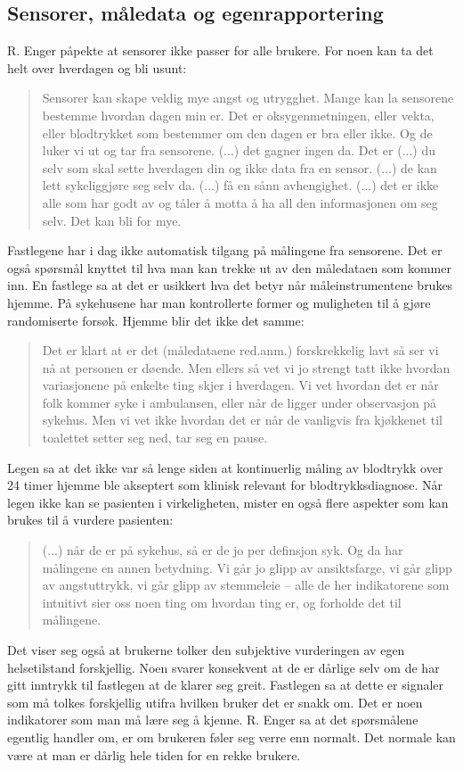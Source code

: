 \subsection{Sensorer, måledata og egenrapportering}
R. Enger påpekte at sensorer ikke passer for alle brukere. For noen kan ta det helt over hverdagen og bli usunt:

\blockquote{Sensorer kan skape veldig mye angst og utrygghet. Mange kan la sensorene bestemme hvordan dagen min er. Det er oksygenmetningen,
    eller vekta, eller blodtrykket som bestemmer om den dagen er bra eller ikke. Og de luker vi ut og tar fra sensorene. (...) det
    gagner ingen da. Det er (...) du selv som skal sette hverdagen din og ikke data fra en sensor.
    (...) de kan lett sykeliggjøre seg selv da. (...) få en sånn avhengighet. (...) det er ikke alle som har godt av og tåler å motta å ha
    all den informasjonen om seg selv. Det kan bli for mye.}

Fastlegene har i dag ikke automatisk tilgang på målingene fra sensorene. Det er også spørsmål knyttet til hva man kan trekke ut av den
måledataen som kommer inn. En fastlege sa at det er usikkert hva det betyr når måleinstrumentene brukes hjemme. På sykehusene har man
kontrollerte former og muligheten til å gjøre randomiserte forsøk. Hjemme blir det ikke det samme:

\blockquote{Det er klart at er det (måledataene red.anm.) forskrekkelig lavt så ser vi nå at personen er døende. Men ellers så vet vi jo strengt tatt ikke
    hvordan variasjonene på enkelte ting
    skjer i hverdagen. Vi vet hvordan det er når folk kommer syke i ambulansen, eller når de ligger under observasjon på sykehus.
    Men vi vet ikke hvordan det er når de vanligvis fra kjøkkenet til toalettet setter seg ned, tar seg en pause.}

Legen sa at det ikke var så lenge siden at kontinuerlig måling av blodtrykk over 24 timer hjemme ble akseptert som klinisk relevant
for blodtrykksdiagnose. Når legen ikke kan se pasienten i virkeligheten, mister en også flere aspekter som kan brukes til å vurdere
pasienten: \blockquote{
    (...) når de er på sykehus, så er de jo per definsjon syk. Og da har målingene en annen betydning. Vi går jo glipp av ansiktsfarge,
    vi går glipp av angstuttrykk, vi går glipp
av stemmeleie -- alle de her indikatorene som intuitivt sier oss noen ting om hvordan ting er, og forholde det til målingene.}

Det viser seg også at brukerne tolker den subjektive vurderingen av egen helsetilstand forskjellig. Noen svarer konsekvent at de er dårlige
selv om de har gitt inntrykk til fastlegen at de klarer seg greit. Fastlegen sa at dette er signaler som må tolkes forskjellig utifra hvilken
bruker det er snakk om. Det er noen indikatorer som man må lære seg å kjenne. R. Enger sa at det spørsmålene egentlig handler om, er om
brukeren føler seg verre enn normalt. Det normale kan være at man er dårlig hele tiden for en rekke brukere.

